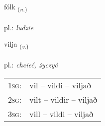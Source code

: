 \documentclass[frontgrid, backgrid]{flacards}\usepackage[]{graphicx}\usepackage[]{xcolor}
\begin{document}
{fólk \small{\textsubscript{(\textit{n.})}} \\[1ex] %
\textphonetic{[foul̥k]} \\
pl.: \emph{ludzie} \\  [2ex]
\renewcommand*{\arraystretch}{0.8}
}

\renewcommand{\flhead}{\vskip5pt \fboxsep=0pt {\small\bfseries\footnotesize Sagnorð | Verb}}
\renewcommand{\fcfoot}{\vskip5pt \fboxsep=0pt \hspace{2pt}{\small\bfseries\footnotesize 1K}}

\renewcommand{\blhead}{\vskip5pt {\small\bfseries\footnotesize Sagnorð | Verb }}
\renewcommand{\bcfoot}{\vskip5pt \hspace{2pt}{\small\bfseries\footnotesize 1K}}


{vilja \small{\textsubscript{(\textit{v.})}} \\[1ex] %
\textphonetic{[vɪlja]} \\
pl.: \emph{chcieć, życzyć} \\  [2ex]
\renewcommand*{\arraystretch}{0.8}
\begin{tabular}{p{1cm}l}
\textsc{1sg}: & vil -- vildi -- viljað \\ 
\textsc{2sg}: & vilt -- vildir -- viljað \\ 
\textsc{3sg}: & vill -- vildi -- viljað \\ 
\end{tabular}
}

\renewcommand{\flhead}{\vskip5pt \fboxsep=0pt {\small\bfseries\footnotesize Lýsingarorð | Adjective}}
\renewcommand{\fcfoot}{\vskip5pt \fboxsep=0pt \hspace{2pt}{\small\bfseries\footnotesize 1K}}

\renewcommand{\blhead}{\vskip5pt {\small\bfseries\footnotesize Lýsingarorð | Adjective }}
\renewcommand{\bcfoot}{\vskip5pt \hspace{2pt}{\small\bfseries\footnotesize 1K}}
\end{document}
